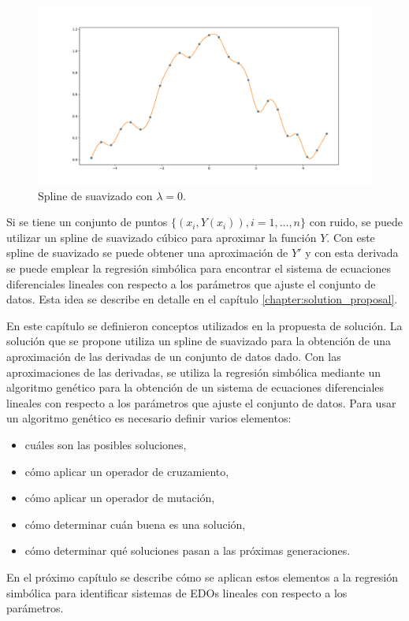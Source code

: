 \begin{figure}[h]
    \centering
    \includegraphics[width=\textwidth]{"figures/spline_1.pdf"}
    \caption{Spline de suavizado con $\lambda = 0$.}
    \label{fig:spline_1}
\end{figure}


Si se tiene un conjunto de puntos $\{(x_i, Y(x_i)), i = 1, \dots, n\}$ con ruido, se puede utilizar un spline de suavizado cúbico para aproximar la función $Y$. Con este spline de suavizado se puede obtener una aproximación de $Y'$ y con esta derivada se puede emplear la regresión simbólica para encontrar el sistema de ecuaciones diferenciales lineales con respecto a los parámetros que ajuste el conjunto de datos. Esta idea se describe en detalle en el capítulo \ref{chapter:solution_proposal}.

En este capítulo se definieron conceptos utilizados en la propuesta de solución. La solución que se propone utiliza un spline de suavizado para la obtención de una aproximación de las derivadas de un conjunto de datos dado. Con las aproximaciones de las derivadas, se utiliza la regresión simbólica mediante un algoritmo genético para la obtención de un sistema de ecuaciones diferenciales lineales con respecto a los parámetros que ajuste el conjunto de datos. Para usar un algoritmo genético es necesario definir varios elementos:

\begin{itemize}
    \item cuáles son las posibles soluciones,
    \item cómo aplicar un operador de cruzamiento,
    \item cómo aplicar un operador de mutación,
    \item cómo determinar cuán buena es una solución,
    \item cómo determinar qué soluciones pasan a las próximas generaciones.
\end{itemize}

En el próximo capítulo se describe cómo se aplican estos elementos a la regresión simbólica para identificar sistemas de EDOs lineales con respecto a los parámetros.
